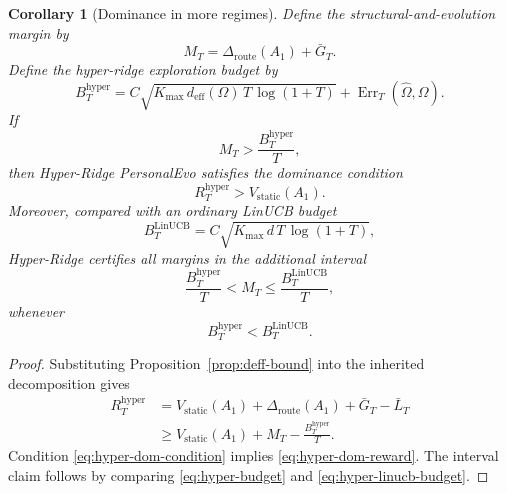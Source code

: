 \documentclass{article} %
\newtheorem{corollary}[theorem]{Corollary}
\begin{document}
\begin{corollary}[Dominance in more regimes]
\label{cor:hyper-dominance}
Define the structural-and-evolution margin by
\begin{equation}
\label{eq:hyper-margin}
M_T
=
\Delta_{\mathrm{route}}(A_1)+\bar G_T.
\end{equation}
Define the hyper-ridge exploration budget by
\begin{equation}
\label{eq:hyper-budget}
B_T^{\mathrm{hyper}}
=
C
\sqrt{
K_{\max}\,
d_{\mathrm{eff}}(\Omega)\,
T\,
\log(1+T)
}
+
\operatorname{Err}_{T}(\widehat{\Omega},\Omega).
\end{equation}
If
\begin{equation}
\label{eq:hyper-dom-condition}
M_T
>
\frac{B_T^{\mathrm{hyper}}}{T},
\end{equation}
then Hyper-Ridge PersonalEvo satisfies the dominance condition
\begin{equation}
\label{eq:hyper-dom-reward}
R_T^{\mathrm{hyper}}
>
V_{\mathrm{static}}(A_1).
\end{equation}
Moreover, compared with an ordinary LinUCB budget
\begin{equation}
\label{eq:hyper-linucb-budget}
B_T^{\mathrm{LinUCB}}
=
C
\sqrt{
K_{\max}\,
d\,
T\,
\log(1+T)
},
\end{equation}
Hyper-Ridge certifies all margins in the additional interval
\begin{equation}
\label{eq:hyper-new-regime}
\frac{B_T^{\mathrm{hyper}}}{T}
<
M_T
\le
\frac{B_T^{\mathrm{LinUCB}}}{T},
\end{equation}
whenever
\begin{equation}
\label{eq:hyper-budget-order}
B_T^{\mathrm{hyper}}
<
B_T^{\mathrm{LinUCB}}.
\end{equation}
\end{corollary}

\begin{proof}
Substituting Proposition~\ref{prop:deff-bound} into the inherited decomposition gives
\begin{align}
R_T^{\mathrm{hyper}}
&=
V_{\mathrm{static}}(A_1)
+
\Delta_{\mathrm{route}}(A_1)
+
\bar G_T
-
\bar L_T
\nonumber\\
&\ge
V_{\mathrm{static}}(A_1)
+
M_T
-
\frac{B_T^{\mathrm{hyper}}}{T}.
\label{eq:hyper-cor-proof}
\end{align}
Condition \eqref{eq:hyper-dom-condition} implies \eqref{eq:hyper-dom-reward}. The interval claim follows by comparing \eqref{eq:hyper-budget} and \eqref{eq:hyper-linucb-budget}.
\end{proof}
\end{document}
